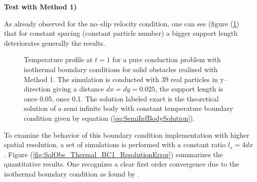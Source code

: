 \documentclass{report}
\begin{document}
\vspace{1cm}
{\bf Test with Method 1) }
\linebreak[2]

As already observed for the no--slip velocity condition, one can see (figure (\ref{fig:SolObs_Thermal_BC1_profile}) that for constant spacing (constant particle number) a bigger support length deteriorates generally the results.


\begin{figure}[!htbp]
\centering
\label{fig:SolObs_Thermal_BC1_profile}
\caption[Temperature Profile at wall]{Temperature profile at $t=1$ for a pure conduction problem with isothermal boundary conditions for solid obstacles realized with Method 1. The simulation is conducted with 39 real particles in y--direction giving a distance $dx=dy=0.025$, the support length is once 0.05, once 0.1.
The solution labeled exact is the theoretical solution of a semi infinite body with constant temperature boundary condition given by equation (\ref{eq:SemiInfBodySolution}). }

\end{figure}

To examine the behavior of this boundary condition implementation with higher spatial resolution, a set of simulations is performed with a constant ratio $l_s=4dx$. Figure (\ref{fig:SolObs_Thermal_BC1_ResolutionError}) summarizes the quantitative results. One recognizes a clear first order convergence due to the isothermal boundary condition as found by \cite{Cleary1999}.
\end{document}
